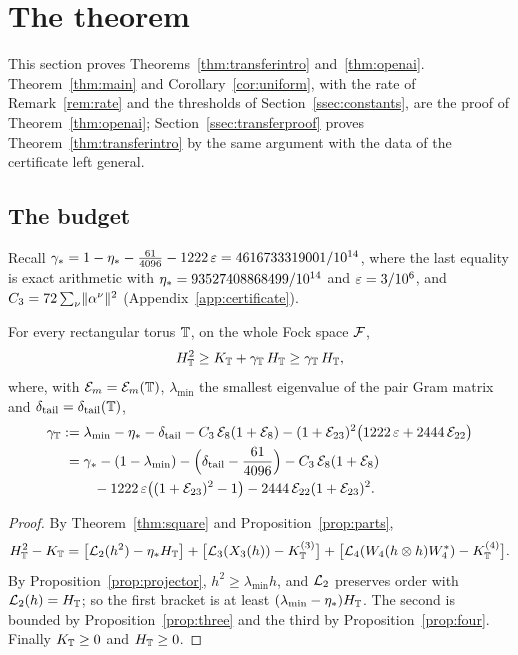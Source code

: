 \section{The theorem}\label{sec:theorem}

This section proves Theorems~\ref{thm:transferintro} and~\ref{thm:openai}. Theorem~\ref{thm:main} and Corollary~\ref{cor:uniform}, with
the rate of Remark~\ref{rem:rate} and the thresholds of Section~\ref{ssec:constants}, are the proof of Theorem~\ref{thm:openai};
Section~\ref{ssec:transferproof} proves Theorem~\ref{thm:transferintro} by the same argument with the data of the certificate left
general.

\subsection{The budget}

Recall $\gamma_{*}=1-\eta_{*}-\frac{61}{4096}-1222\,\varepsilon=4616733319001/10^{14}$, where the last equality is exact arithmetic with
$\eta_{*}=93527408868499/10^{14}$ and $\varepsilon=3/10^6$, and $C_{3}=72\sum_\nu\lVert\alpha^\nu\rVert^2$ (Appendix~\ref{app:certificate}).

\begin{theorem}\label{thm:main}
For every rectangular torus $\mathbb{T}$, on the whole Fock space $\mathcal{F}$,
\[
H_{\mathbb{T}}^2\ge K_{\mathbb{T}}+\gamma_{\mathbb{T}}\,H_{\mathbb{T}}\ge\gamma_{\mathbb{T}}\,H_{\mathbb{T}},
\]
where, with $\mathcal{E}_m=\mathcal{E}_m(\mathbb{T})$, $\lambda_{\min}$ the smallest eigenvalue of the pair Gram matrix and $\delta_{\mathrm{tail}}=\delta_{\mathrm{tail}}(\mathbb{T})$,
\begin{equation}\label{eq:gT}
\begin{aligned}
\gT&:=\lambda_{\min}-\etas-\dtail-\Cth\,\Ec_8(1+\Ec_8)-(1+\Ec_{23})^2\bigl(1222\,\eps+2444\,\Ec_{22}\bigr)\\
&\phantom:=\gs-(1-\lambda_{\min})-\Bigl(\dtail-\frac{61}{4096}\Bigr)-\Cth\,\Ec_8(1+\Ec_8)\\
&\phantom{:=\gs}-1222\,\eps\bigl((1+\Ec_{23})^2-1\bigr)-2444\,\Ec_{22}(1+\Ec_{23})^2 .
\end{aligned}
\end{equation}
\end{theorem}

\begin{proof}
By Theorem~\ref{thm:square} and Proposition~\ref{prop:parts},
\[
H_{\mathbb{T}}^2-K_{\mathbb{T}}=\bigl[\mathcal{L}_2(h^2)-\eta_{*}H_{\mathbb{T}}\bigr]+\bigl[\mathcal{L}_3(X_3(h))-K_{\mathbb{T}}^{(3)}\bigr]+\bigl[\mathcal{L}_4(W_4(h\otimes h)W_4^*)-K_{\mathbb{T}}^{(4)}\bigr].
\]
By Proposition~\ref{prop:projector}, $h^2\ge\lambda_{\min}h$, and $\mathcal{L}_2$ preserves order with $\mathcal{L}_2(h)=H_{\mathbb{T}}$; so the first bracket is at
least $(\lambda_{\min}-\eta_{*})H_{\mathbb{T}}$. The second is bounded by Proposition~\ref{prop:three} and the third by Proposition~\ref{prop:four}.
Finally $K_{\mathbb{T}}\ge0$ and $H_{\mathbb{T}}\ge0$.
\end{proof}

